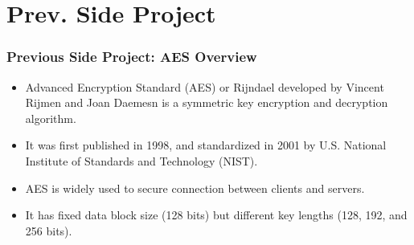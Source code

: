 \documentclass[
	11pt, %
	hmargin=1cm,vmargin=0cm,head=0.5cm,headsep=0pt,foot=0.5cm,margin=2cm
]{beamer}
\begin{document}
\section{Prev. Side Project} 
\begin{frame}
	\frametitle{Previous Side Project: AES Overview}
	
	\begin{itemize}
		\item Advanced Encryption Standard (AES) or Rijndael developed by Vincent Rijmen and Joan Daemesn is a symmetric key encryption and decryption algorithm.
		\item It was first published in 1998, and standardized in 2001 by U.S. National Institute of Standards and Technology (NIST).
		\item AES is widely used to secure connection between clients and servers.
		\item It has fixed data block size (128 bits) but different key lengths (128, 192, and 256 bits).
	\end{itemize}
\end{frame}
\end{document}
